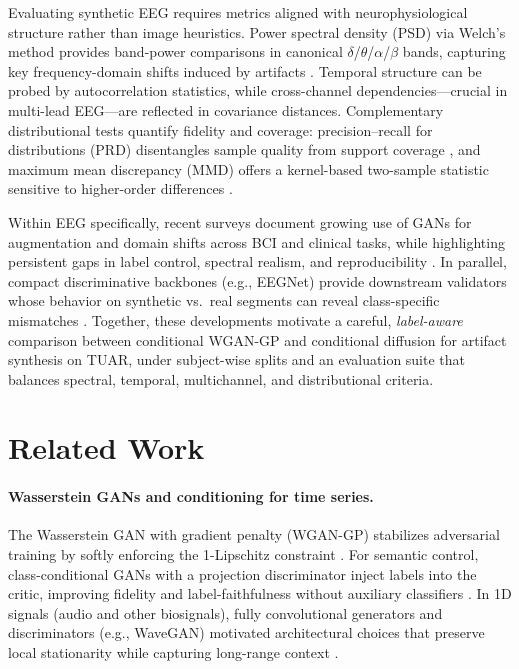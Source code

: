 \documentclass{article}
\begin{document}
Evaluating synthetic EEG requires metrics aligned with neurophysiological structure rather than image heuristics. Power spectral density (PSD) via Welch’s method provides band-power comparisons in canonical $\delta$/$\theta$/$\alpha$/$\beta$ bands, capturing key frequency-domain shifts induced by artifacts \citep{welch1967fft}. Temporal structure can be probed by autocorrelation statistics, while cross-channel dependencies—crucial in multi-lead EEG—are reflected in covariance distances. Complementary distributional tests quantify fidelity and coverage: precision–recall for distributions (PRD) disentangles sample quality from support coverage \citep{sajjadi2018assessing}, and maximum mean discrepancy (MMD) offers a kernel-based two-sample statistic sensitive to higher-order differences \citep{binkowski2018demystifying}. 

Within EEG specifically, recent surveys document growing use of GANs for augmentation and domain shifts across BCI and clinical tasks, while highlighting persistent gaps in label control, spectral realism, and reproducibility \citep{habashi2023ganeeg}. In parallel, compact discriminative backbones (e.g., EEGNet) provide downstream validators whose behavior on synthetic vs.\ real segments can reveal class-specific mismatches \citep{lawhern2018eegnet}. Together, these developments motivate a careful, \emph{label-aware} comparison between conditional WGAN-GP and conditional diffusion for artifact synthesis on TUAR, under subject-wise splits and an evaluation suite that balances spectral, temporal, multichannel, and distributional criteria.



\section{Related Work}

\paragraph{Wasserstein GANs and conditioning for time series.}
The Wasserstein GAN with gradient penalty (WGAN-GP) stabilizes adversarial training by softly enforcing the 1-Lipschitz constraint \citep{gulrajani2017improved}. For semantic control, class-conditional GANs with a projection discriminator inject labels into the critic, improving fidelity and label-faithfulness without auxiliary classifiers \citep{miyato2018cgans}. In 1D signals (audio and other biosignals), fully convolutional generators and discriminators (e.g., WaveGAN) motivated architectural choices that preserve local stationarity while capturing long-range context \citep{donahue2018wavegan}. 
\end{document}
